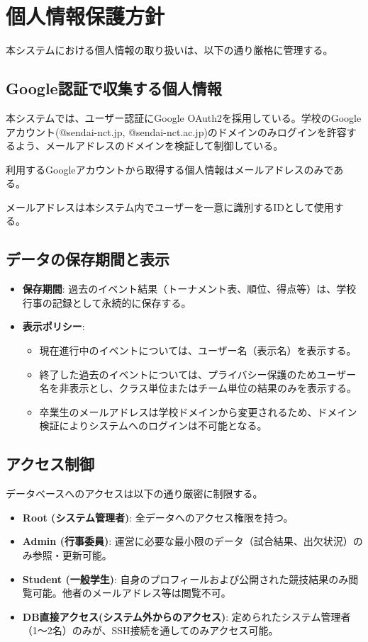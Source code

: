 \documentclass[paper=a4, fontsize=11pt]{jlreq}
\begin{document}
\newpage

\section{個人情報保護方針}

本システムにおける個人情報の取り扱いは、以下の通り厳格に管理する。

\subsection{Google認証で収集する個人情報}
本システムでは、ユーザー認証にGoogle OAuth2を採用している。学校のGoogle アカウント(@sendai-nct.jp, @sendai-nct.ac.jp)のドメインのみログインを許容するよう、メールアドレスのドメインを検証して制御している。

利用するGoogleアカウントから取得する個人情報はメールアドレスのみである。

メールアドレスは本システム内でユーザーを一意に識別するIDとして使用する。

\subsection{データの保存期間と表示}
\begin{itemize}
    \item \textbf{保存期間}: 過去のイベント結果（トーナメント表、順位、得点等）は、学校行事の記録として永続的に保存する。
    \item \textbf{表示ポリシー}:
    \begin{itemize}
        \item 現在進行中のイベントについては、ユーザー名（表示名）を表示する。
        \item 終了した過去のイベントについては、プライバシー保護のためユーザー名を非表示とし、クラス単位またはチーム単位の結果のみを表示する。
        \item 卒業生のメールアドレスは学校ドメインから変更されるため、ドメイン検証によりシステムへのログインは不可能となる。
    \end{itemize}
\end{itemize}

\subsection{アクセス制御}
データベースへのアクセスは以下の通り厳密に制限する。
\begin{itemize}
    \item \textbf{Root (システム管理者)}: 全データへのアクセス権限を持つ。
    \item \textbf{Admin (行事委員)}: 運営に必要な最小限のデータ（試合結果、出欠状況）のみ参照・更新可能。
    \item \textbf{Student (一般学生)}: 自身のプロフィールおよび公開された競技結果のみ閲覧可能。他者のメールアドレス等は閲覧不可。
    \item \textbf{DB直接アクセス(システム外からのアクセス)}: 定められたシステム管理者（1〜2名）のみが、SSH接続を通してのみアクセス可能。
\end{itemize}
\end{document}
